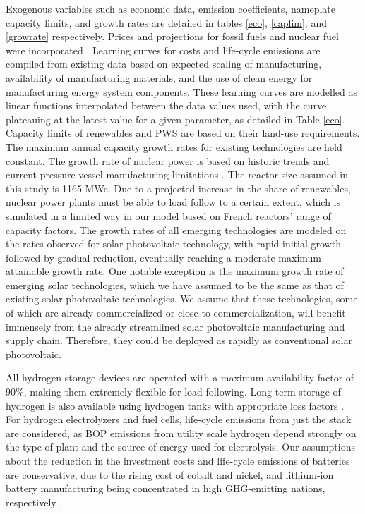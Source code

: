 Exogenous variables such as economic data, emission coefficients, nameplate capacity limits, and growth rates are detailed in tables \ref{eco}, \ref{caplim}, and \ref{growrate} respectively. Prices and projections for fossil fuels and nuclear fuel were incorporated \cite{wittenstein_projected_2015, world_bank_commodity_2016, international_energy_agency_world_2019}. Learning curves for costs and life-cycle emissions are compiled from existing data based on expected scaling of manufacturing, availability of manufacturing materials, and the use of clean energy for manufacturing energy system components. These learning curves are modelled as linear functions interpolated between the data values used, with the curve plateauing at the latest value for a given parameter, as detailed in Table \ref{eco}. Capacity limits of renewables and \gls{PWS} are based on their land-use requirements. The maximum annual capacity growth rates for existing technologies are held constant. The growth rate of nuclear power is based on historic trends and current pressure vessel manufacturing limitations \cite{iaea_pris_nodate}. The reactor size assumed in this study is 1165 MWe. Due to a projected increase in the share of renewables, nuclear power plants must be able to load follow to a certain extent, which is simulated in a limited way in our model based on French reactors' range of capacity factors. The growth rates of all emerging technologies are modeled on the rates observed for solar photovoltaic technology, with rapid initial growth followed by gradual reduction, eventually reaching a moderate maximum attainable growth rate. One notable exception is the maximum growth rate of emerging solar technologies, which we have assumed to be the same as that of existing solar photovoltaic technologies. We assume that these technologies, some of which are already commercialized or close to commercialization, will benefit immensely from the already streamlined solar photovoltaic manufacturing and supply chain. Therefore, they could be deployed as rapidly as conventional solar photovoltaic. 

All hydrogen storage devices are operated with a maximum availability factor of 90\%, making them extremely flexible for load following. Long-term storage of hydrogen is also available using hydrogen tanks with appropriate loss factors \cite{iea_technology_2015}. For hydrogen electrolyzers and fuel cells, life-cycle emissions from just the stack are considered, as \gls{BOP} emissions from utility scale hydrogen depend strongly on the type of plant and the source of energy used for electrolysis. Our assumptions about the reduction in the investment costs and life-cycle emissions of batteries are conservative, due to the rising cost of cobalt and nickel, and lithium-ion battery manufacturing being concentrated in high \gls{GHG}-emitting nations, respectively \cite{oliveira_environmental_2015,emilsson_lithium-ion_2019,turcheniuk_ten_2018,simon_potential_2015}. 

